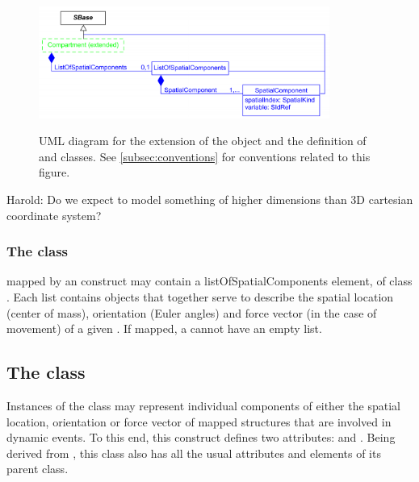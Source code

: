 \begin{figure}[tbhp]
	\centering
	\includegraphics[width=0.85\textwidth]{images/UMLExtendedCompartment.pdf}\\
	\caption{UML diagram for the extension of the \Compartment object and the definition of \ListOfSpatialComponents and \SpatialComponent classes. See \ref{subsec:conventions} for conventions related to this figure.} \label{fig:UMLExtendedCompartment}
\end{figure}

{\color{red} Harold: \notice  Do we expect to model something of higher dimensions than 3D cartesian coordinate system?}

\subsubsection{The  class}
\label{subsec:listSpatialComp}

\Compartments mapped by an \Element construct may contain a listOfSpatialComponents element, of class \ListOfSpatialComponents. Each list contains \SpatialComponent objects that together serve to describe the spatial location (center of mass), orientation (Euler angles) and force vector (in the case of movement) of a given \Compartment. If mapped, a \Compartment cannot have an empty \ListOfSpatialComponents list.

\subsection{The  class}
\label{subsec:spatialComp}

Instances of the \SpatialComponent class may represent individual components of either the spatial location, orientation or force vector of mapped \Compartment structures that are involved in dynamic events. To this end, this construct defines two attributes:  and . Being derived from \SBase, this class also has all the usual attributes and elements of its parent class.

